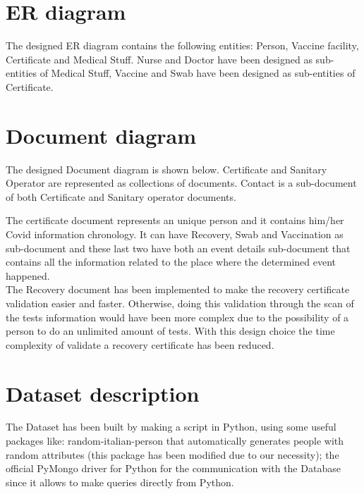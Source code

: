 \documentclass{article}
\begin{document}
\section{ER diagram}
The designed ER diagram contains the following entities: Person, Vaccine facility, Certificate and Medical Stuff. Nurse and Doctor have been designed as sub-entities of Medical Stuff, Vaccine and Swab have been designed as sub-entities of Certificate. 


\newpage

\section{Document diagram}
The designed Document diagram is shown below. Certificate and Sanitary Operator are represented as collections of documents. Contact is a sub-document of both Certificate and Sanitary operator documents. 

The certificate document represents an unique person and it contains him/her Covid information chronology. It can have Recovery, Swab and Vaccination as sub-document and these last two have both an event details sub-document that contains all the information related to the place where the determined event happened.
\hfill\break
\\
The Recovery document has been implemented to make the recovery certificate validation easier and faster. Otherwise, doing this validation through the scan of the tests information would have been more complex due to the possibility of a person to do an unlimited amount of tests.
With this design choice the time complexity of validate a recovery certificate has been reduced.




\newpage

\section{Dataset description}
The Dataset has been built by making a script in Python, using some useful packages like: random-italian-person that automatically generates people with random attributes (this package has been modified due to our necessity); the official PyMongo driver for Python for the communication with the Database since it allows to make queries directly from Python.
\end{document}
